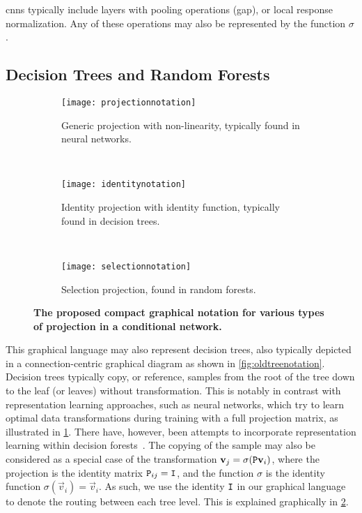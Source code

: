 \documentclass[thesis]{subfiles}
\begin{document}
	\Glspl{cnn} typically include layers with pooling operations (\eg \gls{gap}), or local response normalization. Any of these operations may also be represented by the function $\sigma$.
	
	\subsection{Decision Trees and Random Forests}
	
	\begin{figure}[tbp] 
		\centering
		\begin{subfigure}[b]{\textwidth}
			\centering
			\texttt{[image: projectionnotation]}
			\caption{Generic projection with non-linearity, typically found in neural networks.}\label{fig:projectionnotation}
		\end{subfigure}
		~
		\begin{subfigure}[b]{\textwidth}
			\centering
			\texttt{[image: identitynotation]}
			\caption{Identity projection with identity function, typically found in decision trees.}\label{fig:identitynotation}
		\end{subfigure}
		~
		\begin{subfigure}[b]{\textwidth}
			\centering
			\texttt{[image: selectionnotation]}
			\caption{Selection projection, found in random forests.}\label{fig:selectionnotation}
		\end{subfigure}
		\caption[Various projection matrices in conditional networks]{\textbf{The proposed compact graphical notation for various types of projection in a conditional network.}}\label{fig:projections}
	\end{figure}
	
	This graphical language may also represent decision trees, also typically depicted in a connection-centric graphical diagram as shown in \cref{fig:oldtreenotation}. Decision trees typically copy, or reference, samples from the root of the tree down to the leaf (or leaves) without transformation. This is notably in contrast with representation learning approaches, such as neural networks, which try to learn optimal data transformations during training with a full projection matrix, as illustrated in \cref{fig:projectionnotation}. There have, however, been attempts to incorporate representation learning within decision forests~\citep{montillo2011entangled,BuloKontsch2014}. The copying of the sample may also be considered as a special case of the transformation $\vec v_j = \sigma(\mat P \vec v_i)$, where the projection is the identity matrix $\mat P_{ij} = \mat I$, and the function $\sigma$ is the identity function $\sigma(\vec v_i) = \vec v_i$. As such, we use the identity $\mat I$ in our graphical language to denote the routing between each tree level. This is explained graphically in \cref{fig:identitynotation}.
	
\end{document}
